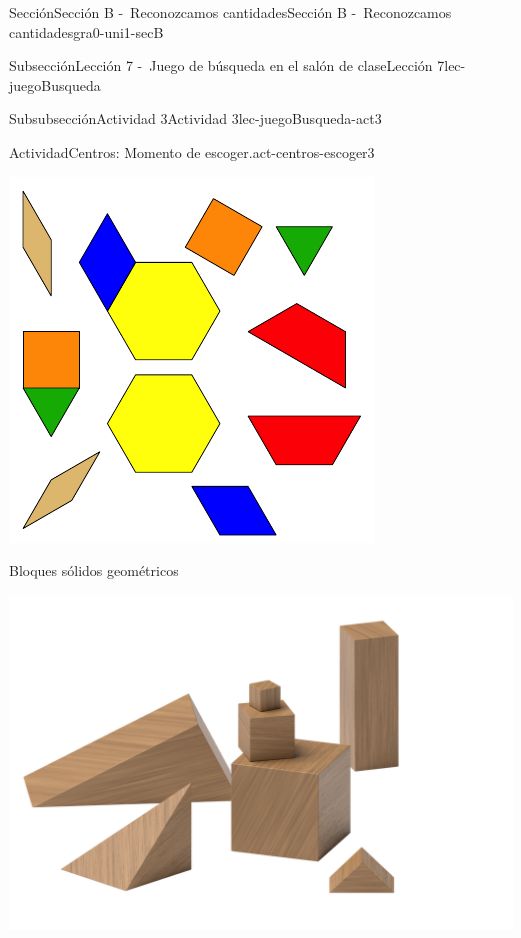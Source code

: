 \documentclass[twoside,10pt,]{article}
\begin{document}
\begin{sectionptx}{Sección}{Sección B -~Reconozcamos cantidades}{}{Sección B -~Reconozcamos cantidades}{}{}{gra0-uni1-secB}
\begin{subsectionptx}{Subsección}{Lección 7 -~Juego de búsqueda en el salón de clase}{}{Lección 7}{}{}{lec-juegoBusqueda}
\begin{subsubsectionptx}{Subsubsección}{Actividad 3}{}{Actividad 3}{}{}{lec-juegoBusqueda-act3}
\begin{activity}{Actividad}{Centros: Momento de escoger.}{act-centros-escoger3}
\begin{sidebyside}{2}{0.025}{0.025}{0.05}
\begin{sbspanel}{0.45}
\includegraphics[width=\linewidth]{external/svg-source/tikz-file-147344.pdf}
\end{sbspanel}%
\end{sidebyside}%
\begin{sidebyside}{2}{0.025}{0.025}{0.05}%
\begin{sbspanel}{0.45}%
Bloques sólidos geométricos%
\par
\includegraphics[width=\linewidth]{external/png-source/K.1.A Beta Student Workbook.Geoblocks.png}
\end{sbspanel}%

\end{sidebyside}
\end{activity}
\end{subsubsectionptx}
\end{subsectionptx}
\end{sectionptx}
\end{document}
